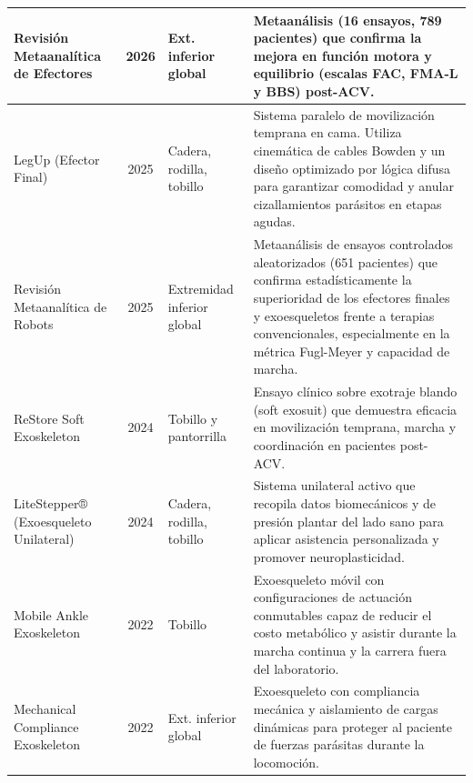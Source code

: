 \documentclass[a4paper,12pt]{article}
\begin{document}
\begin{longtable}{|p{3.5cm}|c|p{3.5cm}|p{7cm}|}
    Revisión Metaanalítica de Efectores \citep{lou2026effect}          & 2026         & Ext. inferior global       & Metaanálisis (16 ensayos, 789 pacientes) que confirma la mejora en función motora y equilibrio (escalas FAC, FMA-L y BBS) post-ACV.                                                                                                                      \\ \hline
    LegUp (Efector Final)\citep{tucan2025}                             & 2025         & Cadera, rodilla, tobillo   & Sistema paralelo de movilización temprana en cama. Utiliza cinemática de cables Bowden y un diseño optimizado por lógica difusa para garantizar comodidad y anular cizallamientos parásitos en etapas agudas.                                            \\ \hline
    Revisión Metaanalítica de Robots\citep{wang2025}                   & 2025         & Extremidad inferior global & Metaanálisis de ensayos controlados aleatorizados (651 pacientes) que confirma estadísticamente la superioridad de los efectores finales y exoesqueletos frente a terapias convencionales, especialmente en la métrica Fugl-Meyer y capacidad de marcha. \\ \hline
    ReStore Soft Exoskeleton\citep{kora2024investigation}              & 2024         & Tobillo y pantorrilla      & Ensayo clínico sobre exotraje blando (soft exosuit) que demuestra eficacia en movilización temprana, marcha y coordinación en pacientes post-ACV.                                                                                                        \\ \hline
    LiteStepper® (Exoesqueleto Unilateral)\citep{huo2024effectiveness} & 2024         & Cadera, rodilla, tobillo   & Sistema unilateral activo que recopila datos biomecánicos y de presión plantar del lado sano para aplicar asistencia personalizada y promover neuroplasticidad.                                                                                          \\ \hline
    Mobile Ankle Exoskeleton\citep{chen2022design}                     & 2022         & Tobillo                    & Exoesqueleto móvil con configuraciones de actuación conmutables capaz de reducir el costo metabólico y asistir durante la marcha continua y la carrera fuera del laboratorio.                                                                            \\ \hline
    Mechanical Compliance Exoskeleton\citep{li2022mechanical}          & 2022         & Ext. inferior global       & Exoesqueleto con compliancia mecánica y aislamiento de cargas dinámicas para proteger al paciente de fuerzas parásitas durante la locomoción.                                                                                                            \\ \hline
\end{longtable}
\endgroup
\end{document}
